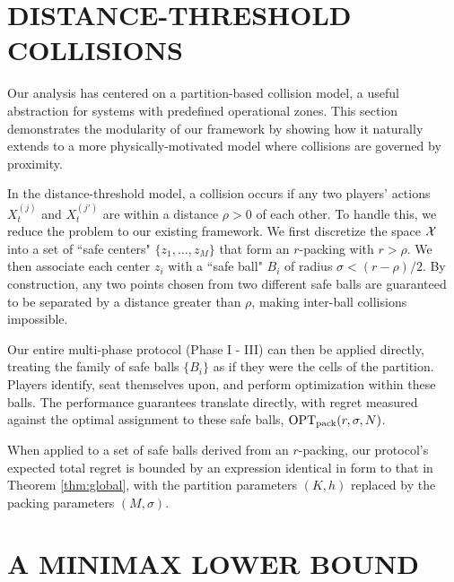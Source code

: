 








\section{DISTANCE-THRESHOLD COLLISIONS}
\label{sec:packing}

Our analysis has centered on a partition-based collision model, a useful abstraction for systems with predefined operational zones. This section demonstrates the modularity of our framework by showing how it naturally extends to a more physically-motivated model where collisions are governed by proximity. 

In the distance-threshold model, a collision occurs if any two players' actions $X_t^{(j)}$ and $X_t^{(j')}$ are within a distance $\rho > 0$ of each other. To handle this, we reduce the problem to our existing framework. We first discretize the space $\mathcal{X}$ into a set of ``safe centers" $\{z_1, \dots, z_M\}$ that form an $r$-packing with $r > \rho$. We then associate each center $z_i$ with a ``safe ball" $B_i$ of radius $\sigma < (r-\rho)/2$. By construction, any two points chosen from two different safe balls are guaranteed to be separated by a distance greater than $\rho$, making inter-ball collisions impossible.

Our entire multi-phase protocol (Phase I - III) can then be applied directly, treating the family of safe balls $\{B_i\}$ as if they were the cells of the partition. Players identify, seat themselves upon, and perform optimization within these balls. The performance guarantees translate directly, with regret measured against the optimal assignment to these safe balls, $\mathrm{OPT}_{\mathrm{pack}}(r,\sigma,N)$.

\begin{theorem}
\label{thm:packing}
When applied to a set of safe balls derived from an $r$-packing, our protocol's expected total regret is bounded by an expression identical in form to that in Theorem \ref{thm:global}, with the partition parameters $(K, h)$ replaced by the packing parameters $(M, \sigma)$.
\end{theorem}

\section{A MINIMAX LOWER BOUND}
\label{sec:lower}

